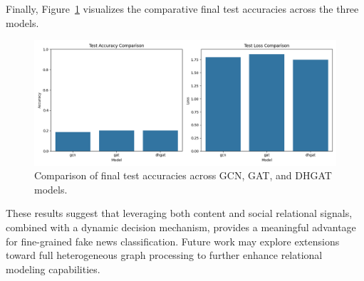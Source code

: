 Finally, Figure~\ref{fig:model_comparison} visualizes the comparative final test accuracies across the three models.

\begin{figure}[H]
    \centering
    \includegraphics[width=0.7\linewidth]{sections/figures/model_comparison.png}
    \caption{Comparison of final test accuracies across GCN, GAT, and DHGAT models.}
    \label{fig:model_comparison}
\end{figure}

These results suggest that leveraging both content and social relational signals, combined with a dynamic decision mechanism, provides a meaningful advantage for fine-grained fake news classification. Future work may explore extensions toward full heterogeneous graph processing to further enhance relational modeling capabilities.
